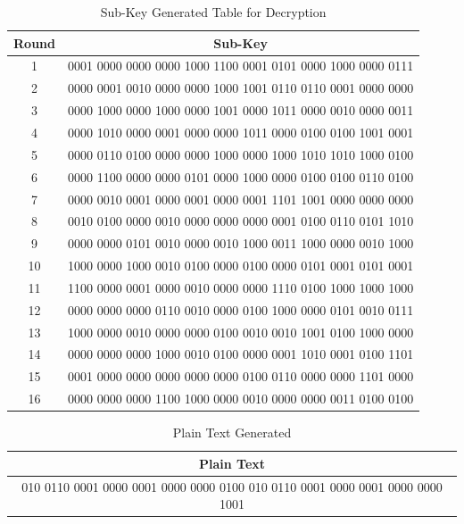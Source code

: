 \documentclass[12pt, letterpaper]{article}
\begin{document}
\begin{table}[h]
    \centering
    \begin{tabular}{|c|c|}
        \hline
        \textbf{Round} & \textbf{Sub-Key} \\
        \hline
        1 & 0001 0000 0000 0000 1000 1100 0001 0101 0000 1000 0000 0111
 \\
        \hline
        2 &  0000 0001 0010 0000 0000 1000 1001 0110 0110 0001 0000 0000
 \\
        \hline
        3 & 0000 1000 0000 1000 0000 1001 0000 1011 0000 0010 0000 0011
 \\
        \hline
        4 & 0000 1010 0000 0001 0000 0000 1011 0000 0100 0100 1001 0001
 \\
        \hline
        5 & 0000 0110 0100 0000 0000 1000 0000 1000 1010 1010 1000 0100
 \\
        \hline 
        6 & 0000 1100 0000 0000 0101 0000 1000 0000 0100 0100 0110 0100
 \\
        \hline
        7 & 0000 0010 0001 0000 0001 0000 0001 1101 1001 0000 0000 0000
 \\
        \hline
        8 &  0010 0100 0000 0010 0000 0000 0000 0001 0100 0110 0101 1010
 \\
        \hline
        9 & 0000 0000 0101 0010 0000 0010 1000 0011 1000 0000 0010 1000
 \\
        \hline
        10 & 1000 0000 1000 0010 0100 0000 0100 0000 0101 0001 0101 0001
 \\
        \hline
        11 & 1100 0000 0001 0000 0010 0000 0000 1110 0100 1000 1000 1000
 \\
        \hline
        12 & 0000 0000 0000 0110 0010 0000 0100 1000 0000 0101 0010 0111 \\
        \hline
        13 &  1000 0000 0010 0000 0000 0100 0010 0010 1001 0100 1000 0000 \\
        \hline
        14 & 0000 0000 0000 1000 0010 0100 0000 0001 1010 0001 0100 1101
 \\
        \hline
        15 &   0001 0000 0000 0000 0000 0000 0100 0110 0000 0000 1101 0000 \\
        \hline
        16 &  0000 0000 0000 1100 1000 0000 0010 0000 0000 0011 0100 0100 \\
        \hline

    \end{tabular}
    \caption{Sub-Key Generated Table for Decryption}
    \label{tab:student-info}
\end{table}

\begin{table}[h]
    \centering
    \begin{tabular}{|c|}
        \hline
          Plain Text \\
        \hline
           010 0110 0001 0000 0001 0000 0000 0100 010 0110 0001 0000 0001 0000 0000 1001
  \\
        \hline
    \end{tabular}
    \caption{Plain Text Generated}
    \label{tab:text-key}
\end{table}
\end{document}
